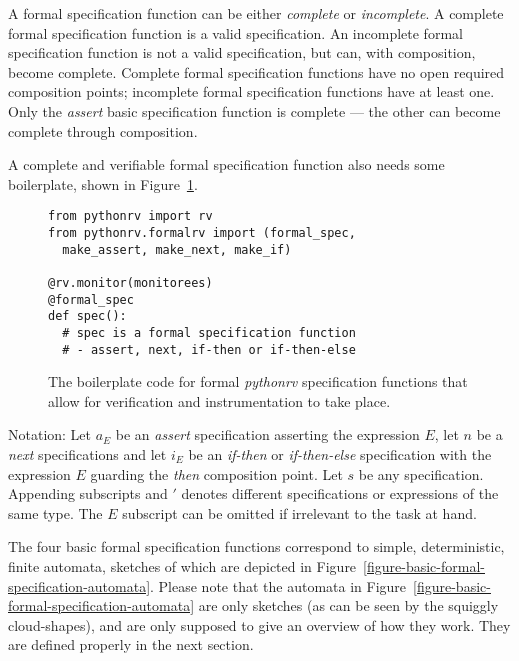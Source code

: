 \begin{mydef}\label{def-composition-complete}
A formal specification function can be either \textit{complete} or
\textit{incomplete}. A complete formal specification function is a valid
specification. An incomplete formal specification function is not a valid
specification, but can, with composition, become complete. Complete formal
specification functions have no open required composition points; incomplete
formal specification functions have at least one. Only the \textit{assert}
basic specification function is complete --- the other can become complete
through composition.
\end{mydef}

A complete and verifiable formal specification function also needs some
boilerplate, shown in Figure~\ref{figure-formal-boilerplate}.

\begin{figure}[h!]
	\begin{center}
	\begin{minipage}{0.7\textwidth}
	\begin{lstlisting}
from pythonrv import rv
from pythonrv.formalrv import (formal_spec,
  make_assert, make_next, make_if)

@rv.monitor(monitorees)
@formal_spec
def spec():
  # spec is a formal specification function
  # - assert, next, if-then or if-then-else
	\end{lstlisting}
	\end{minipage}
	\end{center}

  \caption{The boilerplate code for formal \textit{pythonrv} specification
  functions that allow for verification and instrumentation to take place.}
	\label{figure-formal-boilerplate}
\end{figure}

Notation: Let $a_E$ be an \textit{assert} specification asserting the
expression $E$, let $n$ be a \textit{next} specifications and let $i_E$ be an
\textit{if-then} or \textit{if-then-else} specification with the expression $E$
guarding the \textit{then} composition point. Let $s$ be any specification.
Appending subscripts and $'$ denotes different specifications or expressions of
the same type. The $E$ subscript can be omitted if irrelevant to the task at
hand.

The four basic formal specification functions correspond to simple,
deterministic, finite automata, sketches of which are depicted in
Figure~\ref{figure-basic-formal-specification-automata}. Please note that the
automata in Figure~\ref{figure-basic-formal-specification-automata} are only
sketches (as can be seen by the squiggly cloud-shapes), and are only supposed
to give an overview of how they work. They are defined properly in the next
section.

